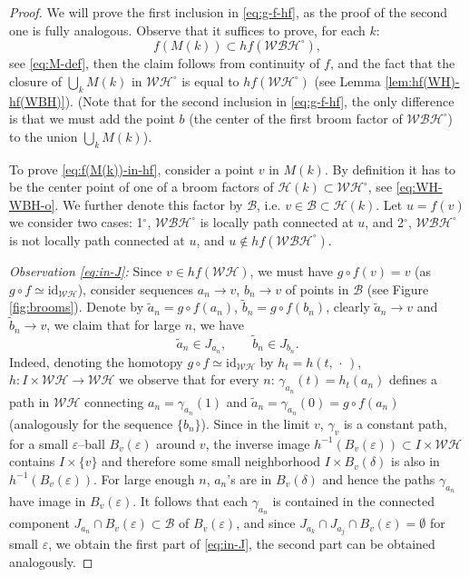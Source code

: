 \documentclass[reqno,12pt]{amsart}
\theoremstyle{ourremark}
\numberwithin{equation}{section}
\numberwithin{theorem}{section}
\begin{document}
\begin{proof}
We will prove the first inclusion in \eqref{eq:g-f-hf}, as the proof of the second one is fully analogous. Observe that it suffices to prove, for each $k$: 
\begin{equation}\label{eq:f(M(k))-in-hf}
 f(M(k))\subset hf(\mathcal{WBH}^\circ),
\end{equation}
see \eqref{eq:M-def}, then the claim follows from continuity of $f$, and the fact that the closure of $\bigcup_k M(k)$ in $\mathcal{WH}^\circ$ is equal to $hf(\mathcal{WH}^\circ)$ (see Lemma \ref{lem:hf(WH)-hf(WBH)}). (Note that for the second inclusion in \eqref{eq:g-f-hf}, the only difference is that we must add the point $b$ (the center of the first broom factor of 
$\mathcal{WBH}^\circ$) to the union $\bigcup_k M(k)$). 

To prove \eqref{eq:f(M(k))-in-hf}, consider a point $v$ in $M(k)$. By definition it has to be the center point of one of a broom factors of $\mathcal{H}(k)\subset \mathcal{WH}^\circ$, see \eqref{eq:WH-WBH-o}. We  further denote this factor by $\mathcal{B}$, i.e. $v\in \mathcal{B}\subset \mathcal{H}(k)$. Let $u=f(v)$ we  consider two cases: 1$^\circ$, $\mathcal{WBH}^\circ$ is locally path connected at $u$, and 2$^\circ$, $\mathcal{WBH}^\circ$ is not locally path connected at $u$, and $u\not\in hf(\mathcal{WBH}^\circ)$. 
 
{\noindent} {\em Observation \eqref{eq:in-J}:} Since $v\in hf(\mathcal{WH})$, we must have $g\circ f(v)=v$ (as $g\circ f\simeq \text{id}_{\mathcal{WH}}$), consider sequences $a_n\to v$, $b_n\to v$ of points in $\mathcal{B}$ (see Figure \ref{fig:brooms}). Denote by $\tilde{a}_n=g\circ f(a_n)$, $\tilde{b}_n=g\circ f(b_n)$, clearly $\tilde{a}_n\to v$ and $\tilde{b}_n\to v$, we claim that for large $n$, we have 
\begin{equation}\label{eq:in-J}
 \tilde{a}_n\in J_{a_n},\qquad \tilde{b}_n\in J_{b_n}.
\end{equation}
{\noindent} Indeed, denoting the homotopy $g\circ f\simeq \text{id}_{\mathcal{WH}}$ by $h_t=h(t,\,\cdot\,)$, $h:I\times \mathcal{WH}\longrightarrow \mathcal{WH}$ we observe that for every $n$: 
$\gamma_{a_n}(t)=h_t(a_n)$ defines a path in $\mathcal{WH}$ connecting $a_n=\gamma_{a_n}(1)$ and $\tilde{a}_n=\gamma_{a_n}(0)=g\circ f(a_n)$ (analogously for the sequence $\{b_n\}$). Since in the limit $v$, $\gamma_v$ is a constant path, for a small $\varepsilon$--ball $B_v(\varepsilon)$ around $v$, the inverse image $h^{-1}(B_v(\varepsilon))\subset I\times \mathcal{WH}$ contains $I\times \{v\}$ and therefore some small neighborhood $I\times B_v(\delta)$ is also in $h^{-1}(B_v(\varepsilon))$.
For large enough $n$, $a_n$'s are in $B_v(\delta)$ and hence the paths $\gamma_{a_n}$ have image in $B_v(\varepsilon)$. It follows that each  $\gamma_{a_n}$ is contained in the connected component $J_{a_n}\cap B_v(\varepsilon)\subset \mathcal{B}$ of $B_v(\varepsilon)$, and since $J_{a_k}\cap J_{a_j}\cap B_v(\varepsilon)=\emptyset$ for small $\varepsilon$, we obtain the first part of \eqref{eq:in-J}, the second part can be obtained analogously.


\end{proof}
\end{document}
